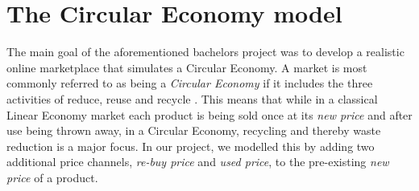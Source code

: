 
\section{The Circular Economy model}\label{sec:CircularEconomy}
The main goal of the aforementioned bachelors project was to develop a realistic online marketplace that simulates a Circular Economy. A market is most commonly referred to as being a \emph{Circular Economy} if it includes the three activities of reduce, reuse and recycle \cite{circularEconomyDefinition}. This means that while in a classical Linear Economy market each product is being sold once at its \emph{new price} and after use being thrown away, in a Circular Economy, recycling and thereby waste reduction is a major focus. In our project, we modelled this by adding two additional price channels, \emph{re-buy price} and \emph{used price}, to the pre-existing \emph{new price} of a product.

